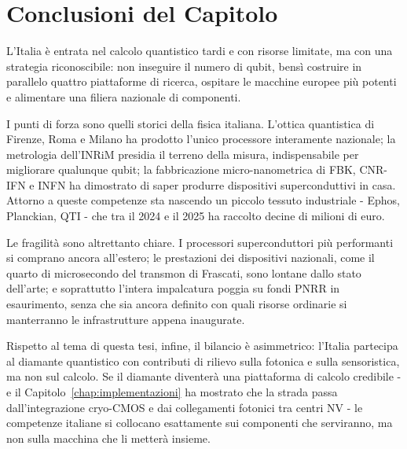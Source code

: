 \section{Conclusioni del Capitolo}
\label{sec:it-conclusioni}

L'Italia è entrata nel calcolo quantistico tardi e con risorse limitate, ma
con una strategia riconoscibile: non inseguire il numero di qubit, bensì
costruire in parallelo quattro piattaforme di ricerca, ospitare le macchine
europee più potenti e alimentare una filiera nazionale di componenti.

I punti di forza sono quelli storici della fisica italiana. L'ottica
quantistica di Firenze, Roma e Milano ha prodotto l'unico processore
interamente nazionale; la metrologia dell'INRiM presidia il terreno della
misura, indispensabile per migliorare qualunque qubit; la fabbricazione
micro-nanometrica di FBK, CNR-IFN e INFN ha dimostrato di saper produrre
dispositivi superconduttivi in casa. Attorno a queste competenze sta nascendo
un piccolo tessuto industriale - Ephos, Planckian, QTI - che tra il 2024 e il
2025 ha raccolto decine di milioni di euro.

Le fragilità sono altrettanto chiare. I processori superconduttori più
performanti si comprano ancora all'estero; le prestazioni dei dispositivi
nazionali, come il quarto di microsecondo del transmon di Frascati, sono
lontane dallo stato dell'arte; e soprattutto l'intera impalcatura poggia su
fondi PNRR in esaurimento, senza che sia ancora definito con quali risorse
ordinarie si manterranno le infrastrutture appena inaugurate.

Rispetto al tema di questa tesi, infine, il bilancio è asimmetrico: l'Italia
partecipa al diamante quantistico con contributi di rilievo sulla fotonica e
sulla sensoristica, ma non sul calcolo. Se il diamante diventerà una
piattaforma di calcolo credibile - e il Capitolo~\ref{chap:implementazioni} ha
mostrato che la strada passa dall'integrazione cryo-CMOS e dai collegamenti
fotonici tra centri NV - le competenze italiane si collocano esattamente sui
componenti che serviranno, ma non sulla macchina che li metterà insieme.
